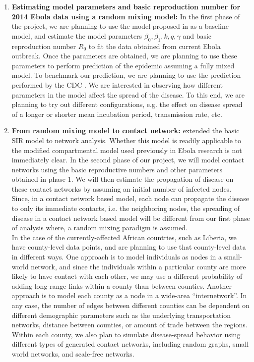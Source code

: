\documentclass[10pt, journal,onecolumn]{IEEEtran}
\begin{document}
\begin{enumerate}

\item \textbf{Estimating model parameters and basic reproduction number for 2014 Ebola data using a random mixing model:}
  In the first phase of the project, we are planning to use the model proposed in
  \citep{chowell2004basic} as a baseline model, and estimate the model parameters $\beta_0, \beta_1,
  k, q, \gamma$  and basic reproduction number $R_0$ to fit the data obtained from current Ebola
  outbreak. Once the parameters are obtained, we are planning to use these parameters to perform
  prediction of the epidemic assuming a fully mixed model. To benchmark our prediction, we are
  planning to use the prediction performed by the CDC \citep{meltzer2014estimating}. We are
  interested in observing how different parameters in the model affect the spread of the disease. To
  this end, we are planning to try out different configurations, e.g. the effect on disease spread
  of a longer or shorter mean incubation period, transmission rate, etc. \\

\item \textbf{From random mixing model to contact network:} \citep{newman2002spread,
  meyers2005network} extended the basic SIR model to network analysis. Whether this model is readily
  applicable to the modified compartmental model used previously in Ebola research
  \citep{chowell2004basic, legrand2007understanding} is not immediately clear. In the second phase of
  our project, we will model contact networks using the basic reproductive numbers and other
  parameters obtained in phase 1. We will then estimate the propagation of disease on these
  contact networks by assuming an initial number of infected nodes. Since, in a contact network based
  model, each node can propagate the disease to only its immediate contacts, i.e. the neighboring
  nodes, the spreading of disease in a contact network based model will be different from our first
  phase of analysis where, a random mixing paradigm is assumed. \\

  In the case of the currently-affected African countries, such as Liberia,
  we have county-level data points, and are planning to use that county-level data in different ways.
  One approach is to model individuals as nodes in a small-world network, and
  since the individuals within a particular county are more likely to have contact with each other,
  we may use a different probability of adding long-range links within a county than between counties.
  Another approach is to model each county as a node in a wide-area ``internetwork''.
  In any case, the number of edges between different counties can be dependent on different
  demographic parameters such as the underlying transportation networks, distance between counties,
  or amount of trade between the regions.
  Within each county, we also plan to simulate disease-spread behavior using different types of
  generated contact networks, including random graphs, small world networks, and scale-free
  networks. \\


\end{enumerate}
\end{document}
